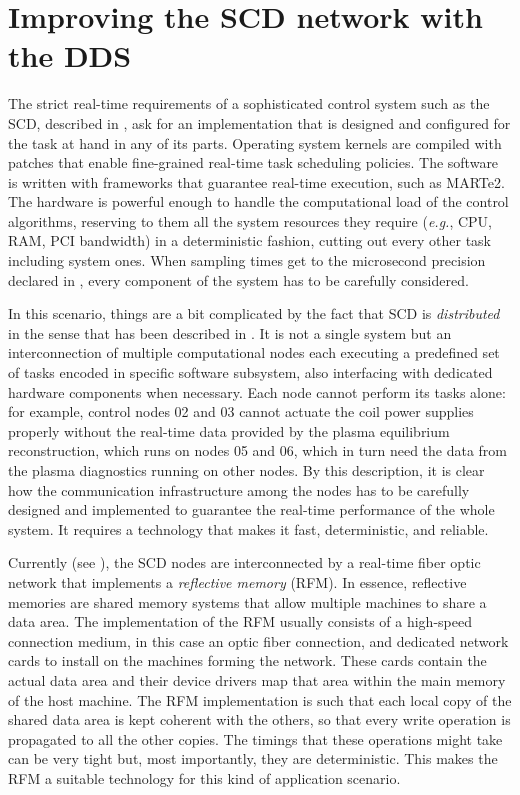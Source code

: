 \section{Improving the SCD network with the DDS}
\label{sec:ddstcv}
The strict real-time requirements of a sophisticated control system such as the SCD, described in , ask for an implementation that is designed and configured for the task at hand in any of its parts. Operating system kernels are compiled with patches that enable fine-grained real-time task scheduling policies. The software is written with frameworks that guarantee real-time execution, such as MARTe2. The hardware is powerful enough to handle the computational load of the control algorithms, reserving to them all the system resources they require (\emph{e.g.}, CPU, RAM, PCI bandwidth) in a deterministic fashion, cutting out every other task including system ones. When sampling times get to the microsecond precision declared in , every component of the system has to be carefully considered.

In this scenario, things are a bit complicated by the fact that SCD is \emph{distributed} in the sense that has been described in . It is not a single system but an interconnection of multiple computational nodes each executing a predefined set of tasks encoded in specific software subsystem, also interfacing with dedicated hardware components when necessary. Each node cannot perform its tasks alone: for example, control nodes 02 and 03 cannot actuate the coil power supplies properly without the real-time data provided by the plasma equilibrium reconstruction, which runs on nodes 05 and 06, which in turn need the data from the plasma diagnostics running on other nodes. By this description, it is clear how the communication infrastructure among the nodes has to be carefully designed and implemented to guarantee the real-time performance of the whole system. It requires a technology that makes it fast, deterministic, and reliable.

Currently (see \cite{galperti_overview_2024}), the SCD nodes are interconnected by a real-time fiber optic network that implements a \emph{reflective memory} (RFM). In essence, reflective memories are shared memory systems that allow multiple machines to share a data area. The implementation of the RFM usually consists of a high-speed connection medium, in this case an optic fiber connection, and dedicated network cards to install on the machines forming the network. These cards contain the actual data area and their device drivers map that area within the main memory of the host machine. The RFM implementation is such that each local copy of the shared data area is kept coherent with the others, so that every write operation is propagated to all the other copies. The timings that these operations might take can be very tight but, most importantly, they are deterministic. This makes the RFM a suitable technology for this kind of application scenario.

